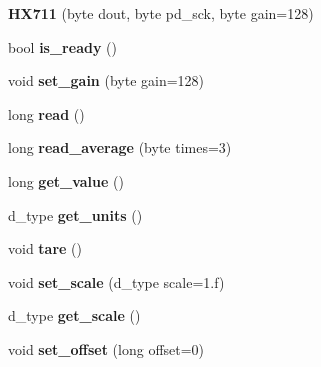 \begin{DoxyCompactItemize}
\item 
\hypertarget{class_h_x711_a40abd49bd62d5ed4590b19831a852943}{{\bfseries H\-X711} (byte dout, byte pd\-\_\-sck, byte gain=128)}\label{class_h_x711_a40abd49bd62d5ed4590b19831a852943}

\item 
\hypertarget{class_h_x711_aab3f9242a603af7dfe396584d0e4cb3b}{bool {\bfseries is\-\_\-ready} ()}\label{class_h_x711_aab3f9242a603af7dfe396584d0e4cb3b}

\item 
\hypertarget{class_h_x711_a7a061e2642f9e9051b2fd149e00b369b}{void {\bfseries set\-\_\-gain} (byte gain=128)}\label{class_h_x711_a7a061e2642f9e9051b2fd149e00b369b}

\item 
\hypertarget{class_h_x711_a6f62858732ea430a7d61d23cdd5c90d0}{long {\bfseries read} ()}\label{class_h_x711_a6f62858732ea430a7d61d23cdd5c90d0}

\item 
\hypertarget{class_h_x711_a4269eeeb1dd6167ba00c9dc25a0935d1}{long {\bfseries read\-\_\-average} (byte times=3)}\label{class_h_x711_a4269eeeb1dd6167ba00c9dc25a0935d1}

\item 
\hypertarget{class_h_x711_aa912cc60e49df9cc314688f7301ad5fc}{long {\bfseries get\-\_\-value} ()}\label{class_h_x711_aa912cc60e49df9cc314688f7301ad5fc}

\item 
\hypertarget{class_h_x711_a6f140026805b6a2ef9b61a334daa8e89}{d\-\_\-type {\bfseries get\-\_\-units} ()}\label{class_h_x711_a6f140026805b6a2ef9b61a334daa8e89}

\item 
\hypertarget{class_h_x711_ac712a0d2a329a12c332da822987bd894}{void {\bfseries tare} ()}\label{class_h_x711_ac712a0d2a329a12c332da822987bd894}

\item 
\hypertarget{class_h_x711_aea86897b924018ea79c349cfe19a546e}{void {\bfseries set\-\_\-scale} (d\-\_\-type scale=1.f)}\label{class_h_x711_aea86897b924018ea79c349cfe19a546e}

\item 
\hypertarget{class_h_x711_a4e2219ca951b44aaa2adebb68d684e2d}{d\-\_\-type {\bfseries get\-\_\-scale} ()}\label{class_h_x711_a4e2219ca951b44aaa2adebb68d684e2d}

\item 
\hypertarget{class_h_x711_ac4cf05b37725043f11c338227a328893}{void {\bfseries set\-\_\-offset} (long offset=0)}\label{class_h_x711_ac4cf05b37725043f11c338227a328893}


\end{DoxyCompactItemize}
